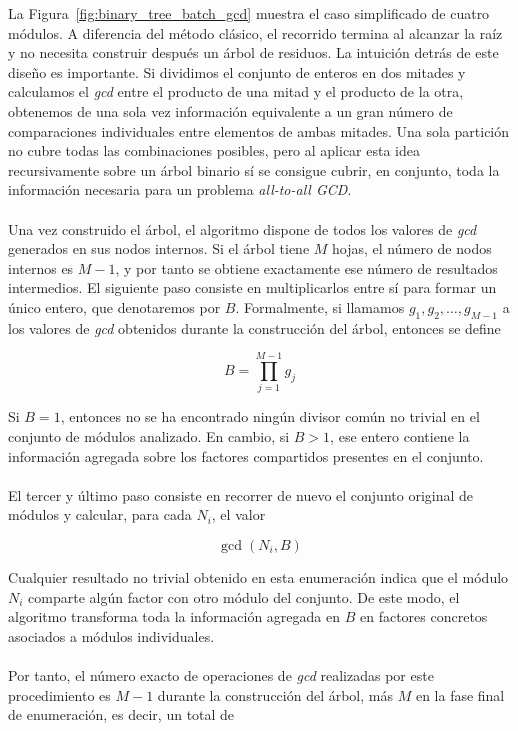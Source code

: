 La Figura~\ref{fig:binary_tree_batch_gcd} muestra el caso simplificado de cuatro
módulos. A diferencia del método clásico, el recorrido termina al
alcanzar la raíz y no necesita construir después un árbol de residuos.
La intuición detrás de este diseño es importante. Si dividimos el conjunto de enteros en dos mitades y calculamos el \textit{gcd} entre el producto de una mitad y el producto de la otra, obtenemos de una sola vez información equivalente a un gran número de comparaciones individuales entre elementos de ambas mitades. Una sola partición no cubre todas las combinaciones posibles, pero al aplicar esta idea recursivamente sobre un árbol binario sí se consigue cubrir, en conjunto, toda la información necesaria para un problema \textit{all-to-all GCD}.
\\
\\
Una vez construido el árbol, el algoritmo dispone de todos los valores de \textit{gcd} generados en sus nodos internos. Si el árbol tiene \(M\) hojas, el número de nodos internos es \(M-1\), y por tanto se obtiene exactamente ese número de resultados intermedios. El siguiente paso consiste en multiplicarlos entre sí para formar un único entero, que denotaremos por \(B\). Formalmente, si llamamos \(g_1, g_2, \dots, g_{M-1}\) a los valores de \textit{gcd} obtenidos durante la construcción del árbol, entonces se define

\[
B = \prod_{j=1}^{M-1} g_j
\]

Si \(B = 1\), entonces no se ha encontrado ningún divisor común no trivial en el conjunto de módulos analizado. En cambio, si \(B > 1\), ese entero contiene la información agregada sobre los factores compartidos presentes en el conjunto.
\\
\\
El tercer y último paso consiste en recorrer de nuevo el conjunto original de módulos y calcular, para cada \(N_i\), el valor

\[
\gcd(N_i, B)
\]

Cualquier resultado no trivial obtenido en esta enumeración indica que el módulo \(N_i\) comparte algún factor con otro módulo del conjunto. De este modo, el algoritmo transforma toda la información agregada en \(B\) en factores concretos asociados a módulos individuales.
\\
\\
Por tanto, el número exacto de operaciones de \textit{gcd} realizadas por este procedimiento es \(M-1\) durante la construcción del árbol, más \(M\) en la fase final de enumeración, es decir, un total de

